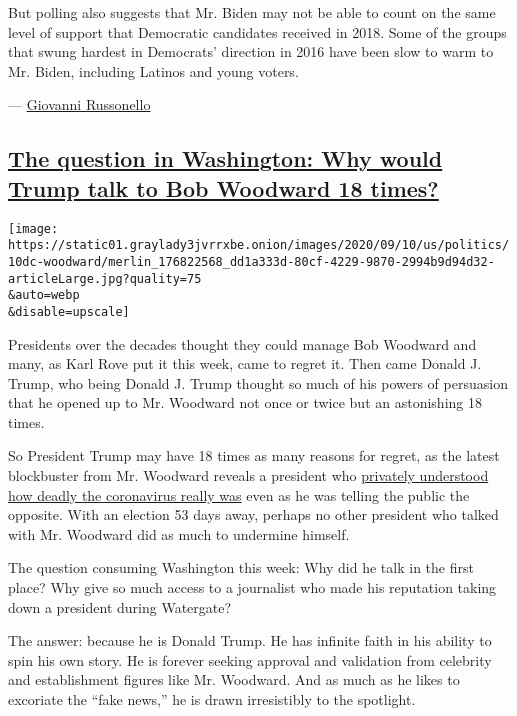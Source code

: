But polling also suggests that Mr. Biden may not be able to count on the
same level of support that Democratic candidates received in 2018. Some
of the groups that swung hardest in Democrats' direction in 2016 have
been slow to warm to Mr. Biden, including Latinos and young voters.

---
\href{https://www.nytimes3xbfgragh.onion/by/giovanni-russonello}{Giovanni
Russonello}

\hypertarget{the-question-in-washington-why-would-trump-talk-to-bob-woodward-18-times}{%
\subsection{\texorpdfstring{\protect\hyperlink{the-question-in-washington-why-would-trump-talk-to-bob-woodward-18-times}{The
question in Washington: Why would Trump talk to Bob Woodward 18
times?}}{The question in Washington: Why would Trump talk to Bob Woodward 18 times?}}\label{the-question-in-washington-why-would-trump-talk-to-bob-woodward-18-times}}

\texttt{[image: https://static01.graylady3jvrrxbe.onion/images/2020/09/10/us/politics/10dc-woodward/merlin\_176822568\_dd1a333d-80cf-4229-9870-2994b9d94d32-articleLarge.jpg?quality=75\\\&auto=webp\\\&disable=upscale]}

Presidents over the decades thought they could manage Bob Woodward and
many, as Karl Rove put it this week, came to regret it. Then came Donald
J. Trump, who being Donald J. Trump thought so much of his powers of
persuasion that he opened up to Mr. Woodward not once or twice but an
astonishing 18 times.

So President Trump may have 18 times as many reasons for regret, as the
latest blockbuster from Mr. Woodward reveals a president who
\href{https://www.nytimes3xbfgragh.onion/2020/09/09/us/politics/woodward-trump-book-virus.html}{privately
understood how deadly the coronavirus really was} even as he was telling
the public the opposite. With an election 53 days away, perhaps no other
president who talked with Mr. Woodward did as much to undermine himself.

The question consuming Washington this week: Why did he talk in the
first place? Why give so much access to a journalist who made his
reputation taking down a president during Watergate?

The answer: because he is Donald Trump. He has infinite faith in his
ability to spin his own story. He is forever seeking approval and
validation from celebrity and establishment figures like Mr. Woodward.
And as much as he likes to excoriate the ``fake news,'' he is drawn
irresistibly to the spotlight.

